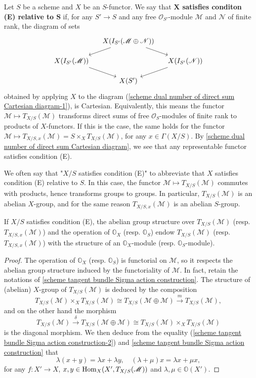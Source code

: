 Let $S$ be a scheme and $X$ be an $S$-functor. We say that \textbf{$\bm{X}$ satisfies conditon (E) relative to $\bm{S}$} if, for any $S'\to S$ and any free $\mathscr{O}_{S'}$-module $\mathscr{M}$ and $\mathscr{N}$ of finite rank, the diagram of sets
\[\begin{tikzcd}[row sep=4mm,column sep=4mm]
&X(I_{S'}(\mathscr{M}\oplus\mathscr{N}))\ar[rd]\ar[ld]&\\
X(I_{S'}(\mathscr{M}))\ar[rd]&&X(I_{S'}(\mathscr{N}))\ar[ld]\\
&X(S')
\end{tikzcd}\]
obtained by applying $X$ to the diagram (\ref{scheme dual number of direct sum Cartesian diagram-1}), is Cartesian. Equivalently, this means the functor $\mathscr{M}\mapsto T_{X/S}(\mathscr{M})$ transforms direct sums of free $\mathscr{O}_S$-modules of finite rank to products of $X$-functors. If this is the case, the same holds for the functor $\mathscr{M}\mapsto T_{X/S,x}(\mathscr{M})=S\times_XT_{X/S}(\mathscr{M})$, for any $x\in\Gamma(X/S)$. By \cref{scheme dual number of direct sum Cartesian diagram}, we see that any representable functor satisfies condition (E).\par
We often say that "$X/S$ satisfies condition (E)" to abbreviate that $X$ satisfies condition (E) relative to $S$. In this case, the functor $\mathscr{M}\mapsto T_{X/S}(\mathscr{M})$ commutes with products, hence transforms groups to groups. In particular, $T_{X/S}(\mathscr{M})$ is an abelian $X$-group, and for the same reason $T_{X/S,x}(\mathscr{M})$ is an abelian $S$-group.

\begin{proposition}\label{scheme tangent bundle condition (E) module structure}
If $X/S$ satisfies condition (E), the abelian group structure over $T_{X/S}(\mathscr{M})$ (resp. $T_{X/S,x}(\mathscr{M})$) and the operation of $\mathbb{O}_X$ (resp. $\mathbb{O}_S$) endow $T_{X/S}(\mathscr{M})$ (resp. $T_{X/S,x}(\mathscr{M})$) with the structure of an $\mathbb{O}_X$-module (resp. $\mathbb{O}_S$-module).
\end{proposition}
\begin{proof}
The operation of $\mathbb{O}_X$ (resp. $\mathbb{O}_S$) is functorial on $\mathscr{M}$, so it respects the abelian group structure induced by the functoriality of $\mathscr{M}$. In fact, retain the notations of \cref{scheme tangent bundle Sigma action construction}. The structure of (abelian) $X$-group of $T_{X/S}(\mathscr{M})$ is deduced by the composition
\[T_{X/S}(\mathscr{M})\times_X T_{X/S}(\mathscr{M})\cong T_{X/S}(\mathscr{M}\oplus\mathscr{M})\stackrel{m}{\to} T_{X/S}(\mathscr{M}),\]
and on the other hand the morphism
\[T_{X/S}(\mathscr{M})\stackrel{\delta}{\to} T_{X/S}(\mathscr{M}\oplus\mathscr{M})\cong T_{X/S}(\mathscr{M})\times_XT_{X/S}(\mathscr{M})\]
is the diagonal morphism. We then deduce from the equality (\ref{scheme tangent bundle Sigma action construction-2}) and \cref{scheme tangent bundle Sigma action construction} that
\[\lambda(x+y)=\lambda x+\lambda y,\quad (\lambda+\mu)x=\lambda x+\mu x,\]
for any $f:X'\to X$, $x,y\in\mathrm{Hom}_X(X',T_{X/S}(\mathscr{M}))$ and $\lambda,\mu\in\mathbb{O}(X')$.
\end{proof}

